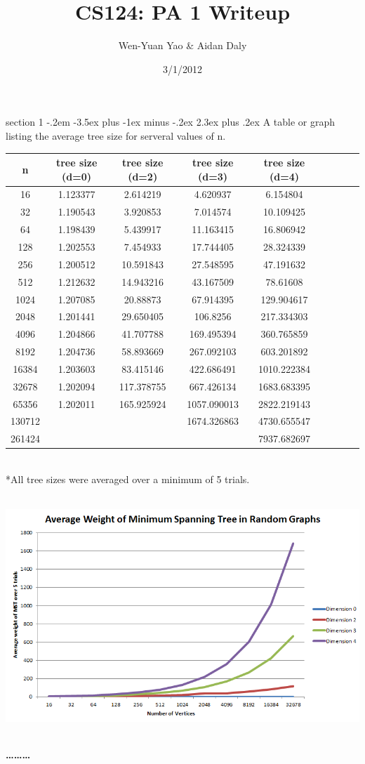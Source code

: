 \documentclass[12pt]{article}
\makeatletter
\newenvironment{problem}{\@startsection
       {section}
       {1}
       {-.2em}
       {-3.5ex plus -1ex minus -.2ex}
       {2.3ex plus .2ex}
       {\pagebreak[3]%
       \large\bf\noindent{Problem }
       }
       }
       {%
       \begin{center}\large\bf \ldots\ldots\ldots\end{center}}
\makeatother
\begin{document}
\title{CS124: PA 1 Writeup}
\author{Wen-Yuan Yao & Aidan Daly}
\date{3/1/2012}
\maketitle
\thispagestyle{empty}

\begin{problem}{}
A table or graph listing the average tree size for serveral values of n.\\

\begin{tabular}{ | c | c | c |c|c|c|c|c|c|}
  \hline                        
  n & tree size (d=0) & tree size (d=2) & tree size (d=3) & tree size (d=4) \\
  \hline
  16&1.123377&2.614219&4.620937&6.154804\\
  32&1.190543&3.920853&7.014574&10.109425\\
  64&1.198439&5.439917&11.163415&16.806942\\
  128&1.202553&7.454933&17.744405&28.324339\\
  256&1.200512&10.591843&27.548595&47.191632\\
  512&1.212632&14.943216&43.167509&78.61608\\
  1024&1.207085&20.88873&67.914395&129.904617\\
  2048&1.201441&29.650405&106.8256&217.334303\\
  4096&1.204866&41.707788&169.495394&360.765859\\
  8192&1.204736&58.893669&267.092103&603.201892\\
  16384&1.203603&83.415146&422.686491&1010.222384\\
  32678&1.202094&117.378755&667.426134&1683.683395\\
  65356&1.202011&165.925924&1057.090013&2822.219143\\
  130712&&&1674.326863&4730.655547\\
  261424&&&&7937.682697\\
  \hline  
\end{tabular}\\

*All tree sizes were averaged over a minimum of 5 trials.

\includegraphics[height=90mm]{tree_size.png}

\end{problem}
\end{document}
